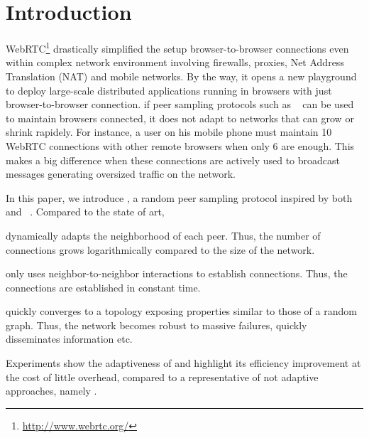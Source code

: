 
\section{Introduction}


WebRTC\footnote{\url{http://www.webrtc.org/}} drastically simplified
the setup browser-to-browser connections even within complex network
environment involving firewalls, proxies, Net Address Translation
(NAT) and mobile networks. By the way, it opens a new playground to
deploy large-scale distributed applications running in browsers with
just browser-to-browser connection. if peer sampling protocols such as
\CYCLON~\cite{voulgaris2005cyclon} can be used to maintain browsers
connected, it does not adapt to networks that can grow or shrink
rapidely. For instance, a user on his mobile phone must maintain 10
WebRTC connections with other remote browsers when only 6 are
enough. This makes a big difference when these connections are
actively used to broadcast messages generating oversized traffic on
the network.

In this paper, we introduce \SPRAY, a random peer sampling protocol inspired by
both \SCAMP~\cite{ganesh2003peer}
and \CYCLON~\cite{voulgaris2005cyclon}. Compared to the state of art,
\begin{inparaenum}[(i)]
\item \SPRAY dynamically adapts the neighborhood of each peer. Thus, the number
  of connections grows logarithmically compared to the size of the network.
\item \SPRAY only uses neighbor-to-neighbor interactions to establish
  connections. Thus, the connections are established in constant time.
\item \SPRAY quickly converges to a topology exposing properties similar to
  those of a random graph. Thus, the network becomes robust to massive
  failures, quickly disseminates information etc.
\item Experiments show the adaptiveness of \SPRAY and highlight its efficiency
  improvement at the cost of little overhead, compared to a representative of
  not adaptive approaches, namely \CYCLON.
\end{inparaenum}

